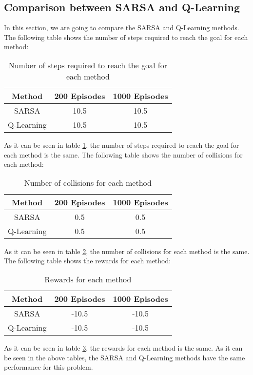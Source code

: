 \documentclass{article}
\begin{document}
	\subsection{Comparison between SARSA and Q-Learning}
	In this section, we are going to compare the SARSA and Q-Learning methods. The following table shows the number of steps required to reach the goal for each method:
	\begin{table}[H]
		\centering
		\caption{Number of steps required to reach the goal for each method}
		\label{tab:steps}
		\begin{tabular}{|c|c|c|}
			\hline
			\textbf{Method} & \textbf{200 Episodes} & \textbf{1000 Episodes} \\ \hline
			SARSA           & 10.5                  & 10.5                   \\ \hline
			Q-Learning      & 10.5                  & 10.5                   \\ \hline
		\end{tabular}
	\end{table}
	As it can be seen in table \ref{tab:steps}, the number of steps required to reach the goal for each method is the same. The following table shows the number of collisions for each method:
	\begin{table}[H]
		\centering
		\caption{Number of collisions for each method}
		\label{tab:collisions}
		\begin{tabular}{|c|c|c|}
			\hline
			\textbf{Method} & \textbf{200 Episodes} & \textbf{1000 Episodes} \\ \hline
			SARSA           & 0.5                   & 0.5                    \\ \hline
			Q-Learning      & 0.5                   & 0.5                    \\ \hline
		\end{tabular}
	\end{table}
	As it can be seen in table \ref{tab:collisions}, the number of collisions for each method is the same. The following table shows the rewards for each method:
	\begin{table}[H]
		\centering
		\caption{Rewards for each method}
		\label{tab:rewards}
		\begin{tabular}{|c|c|c|}
			\hline
			\textbf{Method} & \textbf{200 Episodes} & \textbf{1000 Episodes} \\ \hline
			SARSA           & -10.5                  & -10.5                   \\ \hline
			Q-Learning      & -10.5                  & -10.5                   \\ \hline
		\end{tabular}
	\end{table}
	As it can be seen in table \ref{tab:rewards}, the rewards for each method is the same. As it can be seen in the above tables, the SARSA and Q-Learning methods have the same performance for this problem.

	\tableofcontents
	\listoffigures
	\listoftables
\end{document}
